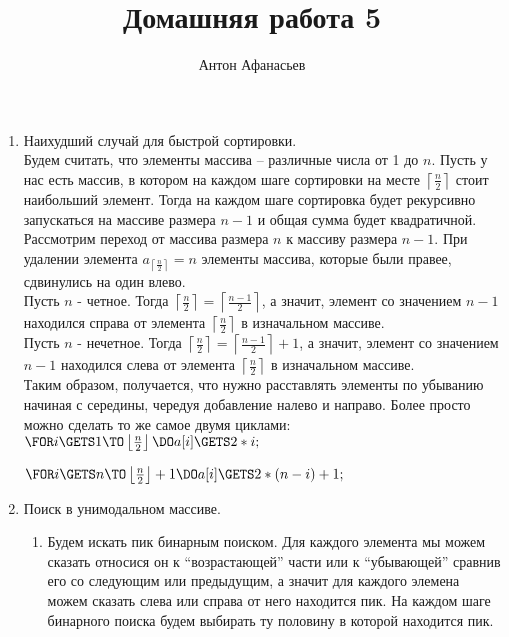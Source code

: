 \documentclass[10pt]{article}
\begin{document}
\title{Домашняя работа 5}
\author{Антон Афанасьев}
\maketitle

\begin{enumerate}
	\item Наихудший случай для быстрой сортировки.\\
	Будем считать, что элементы массива -- различные числа от 1 до $n$. Пусть у нас есть массив, в котором на каждом шаге сортировки на месте $\left \lceil \frac{n}{2} \right \rceil$ стоит наибольший элемент. Тогда на каждом шаге сортировка будет рекурсивно запускаться на массиве размера $n-1$ и общая сумма будет квадратичной.\\
	Рассмотрим переход от массива размера $n$ к массиву размера $n-1$. При удалении элемента $a_{\left \lceil \frac{n}{2} \right \rceil}= n$ элементы массива, которые были правее, сдвинулись на один влево.\\
	Пусть $n$ - четное. Тогда $\left \lceil \frac{n}{2} \right \rceil = \left \lceil \frac{n-1}{2} \right \rceil$, а значит, элемент со значением $n-1$ находился справа от элемента $\left \lceil \frac{n}{2} \right \rceil$ в изначальном массиве.\\
	Пусть $n$ - нечетное. Тогда $\left \lceil \frac{n}{2} \right \rceil = \left \lceil \frac{n-1}{2} \right \rceil + 1$, а значит, элемент со значением $n-1$ находился слева от элемента $\left \lceil \frac{n}{2} \right \rceil$ в изначальном массиве.\\
	Таким образом, получается, что нужно расставлять элементы по убыванию начиная с середины, чередуя добавление налево и направо. Более просто можно сделать то же самое двумя циклами:\\
	$\FOR i \GETS 1 \TO \left \lfloor \frac{n}{2} \right \rfloor \DO
		a[i] \GETS 2*i;
	$
	
	$\FOR i \GETS n \TO \left \lfloor \frac{n}{2} \right \rfloor+1 \DO
		a[i] \GETS 2*(n-i)+1;
	$
	
	\item Поиск в унимодальном массиве.
	\begin{enumerate}
		\item Будем искать пик бинарным поиском. Для каждого элемента мы можем сказать относися он к ``возрастающей'' части или к ``убывающей'' сравнив его со следующим или предыдущим, а значит для каждого элемена можем сказать слева или справа от него находится пик. На каждом шаге бинарного поиска будем выбирать ту половину в которой находится пик.
	\end{enumerate}
	

\end{enumerate}
\end{document}

